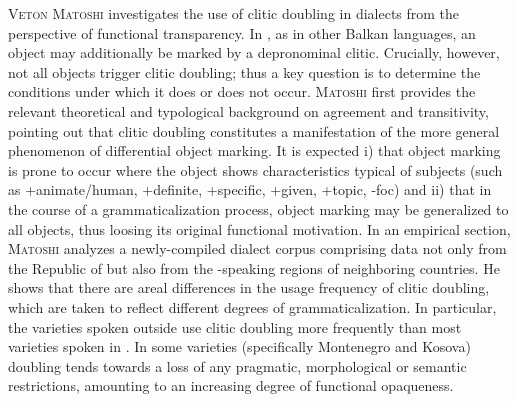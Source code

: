 \documentclass[output=paper,colorlinks,citecolor=brown]{langscibook}
\begin{document}
\textsc{Veton Matoshi} investigates the use of clitic doubling in  dialects from the perspective of functional transparency. In , as in other Balkan languages, an object may additionally be marked by a depronominal clitic. Crucially, however, not all objects trigger clitic doubling; thus a key question is to determine the conditions under which it does or does not occur. \textsc{Matoshi} first provides the relevant theoretical and typological background on agreement and transitivity, pointing out that  clitic doubling constitutes a manifestation of the more general phenomenon of differential object marking. It is expected i) that object marking is prone to occur where the object shows characteristics typical of subjects (such as +animate/human, +definite, +specific, +given, +topic, -foc) and ii) that in the course of a grammaticalization process, object marking may be generalized to all objects, thus loosing its original functional motivation. In an empirical section, \textsc{Matoshi} analyzes a newly-compiled  dialect corpus comprising data not only from the Republic of  but also from the -speaking regions of neighboring countries. He shows that there are areal differences in the usage frequency of clitic doubling, which are taken to reflect different degrees of grammaticalization. In particular, the varieties spoken outside  use clitic doubling more frequently than most varieties spoken in . In some varieties (specifically Montenegro and Kosova) doubling tends towards a loss of any pragmatic, morphological or semantic restrictions, amounting to an increasing degree of functional opaqueness. 
\end{document}
